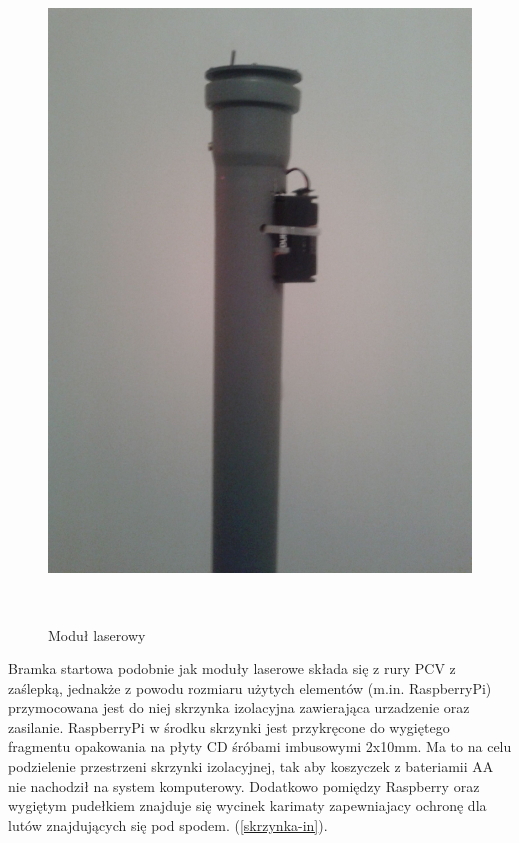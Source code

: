 \documentclass[11pt,a4paper, twoside]{article}
\begin{document}
\begin{figure}[H]
\begin{center}
\includegraphics[scale=0.10]{./img/laser1.jpg}
\caption{Moduł laserowy}
$\label{laser-1}$
\end{center}
\end{figure}
\newpage
Bramka startowa podobnie jak moduły laserowe składa się z rury PCV z zaślepką, jednakże z powodu rozmiaru użytych elementów (m.in. RaspberryPi) przymocowana jest do niej skrzynka izolacyjna zawierająca urzadzenie oraz zasilanie. RaspberryPi w środku skrzynki jest przykręcone do wygiętego fragmentu opakowania na płyty CD śróbami imbusowymi 2x10mm. Ma to na celu podzielenie przestrzeni skrzynki izolacyjnej, tak aby koszyczek z bateriamii AA nie nachodził na system komputerowy. Dodatkowo pomiędzy Raspberry oraz wygiętym pudełkiem znajduje się wycinek karimaty zapewniajacy ochronę dla lutów znajdujących się pod spodem. (\ref{skrzynka-in}).
\end{document}

